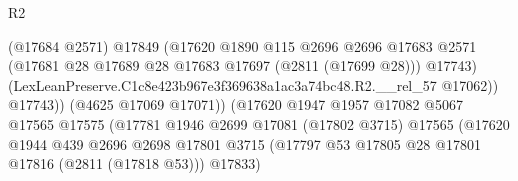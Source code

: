 \begin{lexlean}{R2}
\begin{coremodule}
                                              (@17684 @2571)
                                              @17849
                                              (@17620
                                                @1890
                                                @115
                                                @2696
                                                @2696
                                                @17683
                                                @2571
                                                (@17681
                                                  @28
                                                  @17689
                                                  @28
                                                  @17683
                                                  @17697
                                                  (@2811 (@17699 @28)))
                                                @17743)
                                              (LexLeanPreserve.C1c8e423b967e3f369638a1ac3a74bc48.R2.__rel_57
                                                @17062))
                                            @17743))
                                        (@4625 @17069 @17071))
                                      (@17620
                                        @1947
                                        @1957
                                        @17082
                                        @5067
                                        @17565
                                        @17575
                                        (@17781
                                          @1946
                                          @2699
                                          @17081
                                          (@17802 @3715)
                                          @17565
                                          (@17620
                                            @1944
                                            @439
                                            @2696
                                            @2698
                                            @17801
                                            @3715
                                            (@17797
                                              @53
                                              @17805
                                              @28
                                              @17801
                                              @17816
                                              (@2811 (@17818 @53)))
                                            @17833)

\end{coremodule}
\end{lexlean}

